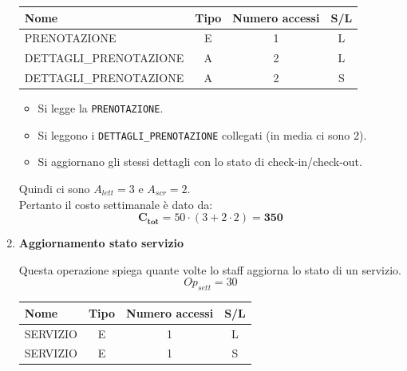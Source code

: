 \documentclass[a4paper,12pt]{report}
\begin{document}
\begin{enumerate}
	      \begin{table}[H]
		      \centering
		      \small
		      \renewcommand{\arraystretch}{1.15}
		      \begin{tabularx}{0.8\textwidth}{|X|c|c|c|}
			      \hline
			      \rowcolor{gray!20}
			      \textbf{Nome}          & \textbf{Tipo} & \textbf{Numero accessi} & \textbf{S/L} \\
			      \hline
			      PRENOTAZIONE           & E             & 1                       & L            \\
			      DETTAGLI\_PRENOTAZIONE & A             & 2                       & L            \\
			      DETTAGLI\_PRENOTAZIONE & A             & 2                       & S            \\
			      \hline
		      \end{tabularx}
	      \end{table}

	      \begin{itemize}
		      \item Si legge la \texttt{PRENOTAZIONE}.
		      \item Si leggono i \texttt{DETTAGLI\_PRENOTAZIONE} collegati (in media ci sono 2).
		      \item Si aggiornano gli stessi dettagli con lo stato di check-in/check-out.
	      \end{itemize}

	      Quindi ci sono $A_{lett}=3$ e $A_{scr}=2$. \\
	      Pertanto il costo settimanale è dato da:
	      $$
		      \mathbf{C_{tot}} = 50 \cdot (3 + 2 \cdot 2) = \mathbf{350}
	      $$

	\item {\large \textbf{Aggiornamento stato servizio}} \label{op14}

	      Questa operazione spiega quante volte lo staff aggiorna lo stato di un servizio.
	      $$
		      Op_{sett} = 30
	      $$

	      \begin{table}[H]
		      \centering
		      \small
		      \renewcommand{\arraystretch}{1.15}
		      \begin{tabularx}{0.8\textwidth}{|X|c|c|c|}
			      \hline
			      \rowcolor{gray!20}
			      \textbf{Nome} & \textbf{Tipo} & \textbf{Numero accessi} & \textbf{S/L} \\
			      \hline
			      SERVIZIO      & E             & 1                       & L            \\
			      SERVIZIO      & E             & 1                       & S            \\
			      \hline
		      \end{tabularx}
	      \end{table}


\end{enumerate}
\end{document}
